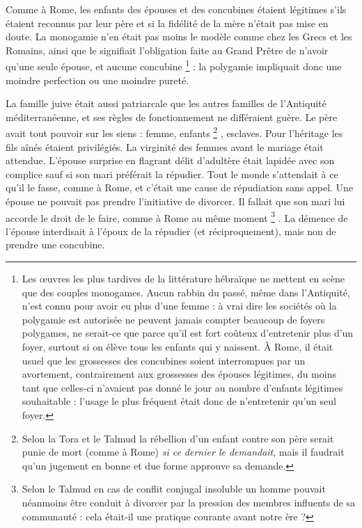  

Comme à Rome, les enfants des épouses et des concubines étaient légitimes s'ils étaient reconnus par leur père et si la fidélité de la mère n'était pas mise en doute. La monogamie n'en était pas moins le modèle comme chez les Grecs et les Romains, ainsi que le signifiait l'obligation faite au Grand Prêtre de n'avoir qu'une seule épouse, et aucune concubine%
\footnote{Les œuvres les plus tardives de la littérature hébraïque ne mettent en scène que des couples monogames. Aucun rabbin du passé, même dans l'Antiquité, n'est connu pour avoir eu plus d'une femme : à vrai dire les sociétés où la polygamie est autorisée ne peuvent jamais compter beaucoup de foyers polygames, ne serait-ce que parce qu'il est fort coûteux d'entretenir plus d'un foyer, surtout si on élève tous les enfants qui y naissent. À Rome, il était usuel que les grossesses des concubines soient interrompues par un avortement, contrairement aux grossesses des épouses légitimes, du moins tant que celles-ci n'avaient pas donné le jour au nombre d'enfants légitimes souhaitable : l'usage le plus fréquent était donc de n'entretenir qu'un seul foyer.}%
 : la polygamie impliquait donc une moindre perfection ou une moindre pureté.

 La famille juive était aussi patriarcale que les autres familles de l'Antiquité méditerranéenne, et ses règles de fonctionnement ne différaient guère. Le père avait tout pouvoir sur les siens : femme, enfants%
\footnote{Selon la Tora et le Talmud la rébellion d'un enfant contre son père serait punie de mort (comme à Rome) \emph{si ce dernier le demandait}, mais il faudrait qu'un jugement en bonne et due forme approuve sa demande.}%
, esclaves. Pour l'héritage les fils aînés étaient privilégiés. La virginité des femmes avant le mariage était attendue. L'épouse surprise en flagrant délit d'adultère était lapidée avec son complice sauf si son mari préférait la répudier. Tout le monde s'attendait à ce qu'il le fasse, comme à Rome, et c'était une cause de répudiation sans appel. Une épouse ne pouvait pas prendre l'initiative de divorcer. Il fallait que son mari lui accorde le droit de le faire, comme à Rome au même moment%
\footnote{Selon le Talmud en cas de conflit conjugal insoluble un homme pouvait néanmoins être conduit à divorcer par la pression des membres influents de sa communauté : cela était-il une pratique courante avant notre ère ?}%
. La démence de l'épouse interdisait à l'époux de la répudier (et réciproquement), mais non de prendre une concubine. 

